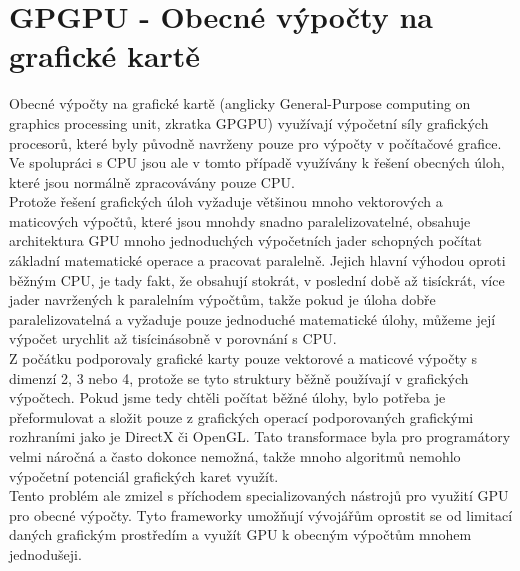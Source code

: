 \chapter{GPGPU - Obecné výpočty na grafické kartě}  \label{sec:gpgpu}
Obecné výpočty na grafické kartě (anglicky General-Purpose computing on graphics processing unit, zkratka GPGPU) využívají výpočetní síly grafických procesorů, které byly původně navrženy pouze pro výpočty v počítačové grafice. Ve spolupráci s CPU jsou ale v tomto případě využívány k řešení obecných úloh, které jsou normálně zpracovávány pouze CPU.\\

Protože řešení grafických úloh vyžaduje většinou mnoho vektorových a maticových výpočtů, které jsou mnohdy snadno paralelizovatelné, obsahuje architektura GPU mnoho jednoduchých výpočetních jader schopných počítat základní matematické operace a pracovat paralelně. Jejich hlavní výhodou oproti běžným CPU, je tady fakt, že obsahují stokrát, v poslední době až tisíckrát, více jader navržených k paralelním výpočtům, takže pokud je úloha dobře paralelizovatelná a vyžaduje pouze jednoduché matematické úlohy, můžeme její výpočet urychlit až tisícinásobně v porovnání s CPU.\\

Z počátku podporovaly grafické karty pouze vektorové a maticové výpočty s dimenzí 2, 3 nebo 4, protože se tyto struktury běžně používají v grafických výpočtech. Pokud jsme tedy chtěli počítat běžné úlohy, bylo potřeba je přeformulovat a složit pouze z grafických operací podporovaných grafickými rozhraními jako je DirectX či OpenGL. Tato transformace byla pro programátory velmi náročná a často dokonce nemožná, takže mnoho algoritmů nemohlo výpočetní potenciál grafických karet využít.\\

Tento problém ale zmizel s příchodem specializovaných nástrojů pro využití GPU pro obecné výpočty. Tyto frameworky umožňují vývojářům oprostit se od limitací daných grafickým prostředím a využít GPU k obecným výpočtům mnohem jednodušeji.~\cite{Kirk12}\\

